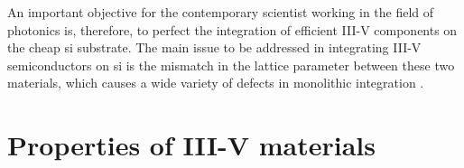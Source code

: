 An important objective for the contemporary scientist working in the field of photonics is, therefore, to perfect the integration of efficient III-V components on the cheap \acl{si} substrate. The main issue to be addressed in integrating III-V semiconductors on \acl{si} is the mismatch in the lattice parameter between these two materials, which causes a wide variety of defects in monolithic integration \cite{Kunert2018}. 

\section{Properties of III-V materials}

\begin{figure}
    \centering
\end{figure}

